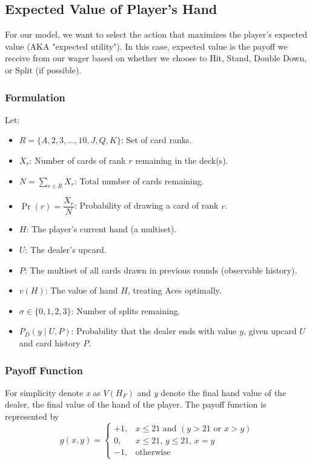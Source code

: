 \documentclass[12pt,a4paper]{cibb}
\begin{document}
\subsection{Expected Value of Player's Hand}
\label{sec:Expected Value}
For our model, we want to select the action that maximizes the player's expected value (AKA "expected utility").
In this case, expected value is the payoff we receive from our wager based on whether we choose to Hit, Stand, Double Down, or Split (if possible). 

\subsubsection{Formulation}

Let:
\begin{itemize}
    \item \( R = \{A, 2, 3, \dots, 10, J, Q, K\} \): Set of card ranks.
    \item \( X_r \): Number of cards of rank \(r\) remaining in the deck(s). 
    \item \( N = \sum_{r \in R} X_r \): Total number of cards remaining. 
    \item \( \Pr(r) = \dfrac{X_r}{N} \): Probability of drawing a card of rank \(r\). 
    \item \( H \): The player's current hand (a multiset).
    \item \( U \): The dealer's upcard.
    \item \( P \): The multiset of all cards drawn in previous rounds (observable history).
    \item \( v(H) \): The value of hand \(H\), treating Aces optimally.
    \item \( σ \in \{0,1,2,3\} \): Number of splits remaining.
    \item \( P_D(y \mid U, P) \): Probability that the dealer ends with value \(y\), given upcard \(U\) and card history \(P\).
\end{itemize}

\subsubsection*{Payoff Function}
For simplicity denote \textit{x} as \( V(H_F)\) and \textit{y} denote the final hand value of the dealer, the final value of the hand of the player. 
The payoff function is represented by
\[
g(x, y) =
\begin{cases}
+1, & x \leq 21 \text{ and } (y > 21 \text{ or } x > y) \\
0, & x \leq 21,\, y \leq 21,\, x = y \\
-1, & \text{otherwise}
\end{cases}
\]
\end{document}
